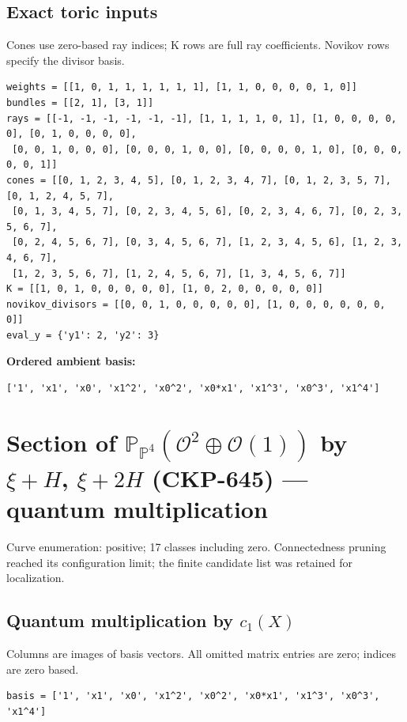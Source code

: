 \documentclass[10pt,a4paper]{article}
\begin{document}
\subsection*{Exact toric inputs}
Cones use zero-based ray indices; K rows are full ray coefficients. Novikov rows specify the divisor basis.

\begin{lstlisting}
weights = [[1, 0, 1, 1, 1, 1, 1, 1], [1, 1, 0, 0, 0, 0, 1, 0]]
bundles = [[2, 1], [3, 1]]
rays = [[-1, -1, -1, -1, -1, -1], [1, 1, 1, 1, 0, 1], [1, 0, 0, 0, 0, 0], [0, 1, 0, 0, 0, 0],
 [0, 0, 1, 0, 0, 0], [0, 0, 0, 1, 0, 0], [0, 0, 0, 0, 1, 0], [0, 0, 0, 0, 0, 1]]
cones = [[0, 1, 2, 3, 4, 5], [0, 1, 2, 3, 4, 7], [0, 1, 2, 3, 5, 7], [0, 1, 2, 4, 5, 7],
 [0, 1, 3, 4, 5, 7], [0, 2, 3, 4, 5, 6], [0, 2, 3, 4, 6, 7], [0, 2, 3, 5, 6, 7],
 [0, 2, 4, 5, 6, 7], [0, 3, 4, 5, 6, 7], [1, 2, 3, 4, 5, 6], [1, 2, 3, 4, 6, 7],
 [1, 2, 3, 5, 6, 7], [1, 2, 4, 5, 6, 7], [1, 3, 4, 5, 6, 7]]
K = [[1, 0, 1, 0, 0, 0, 0, 0], [1, 0, 2, 0, 0, 0, 0, 0]]
novikov_divisors = [[0, 0, 1, 0, 0, 0, 0, 0], [1, 0, 0, 0, 0, 0, 0, 0]]
eval_y = {'y1': 2, 'y2': 3}
\end{lstlisting}

\textbf{Ordered ambient basis:}
\begin{lstlisting}
['1', 'x1', 'x0', 'x1^2', 'x0^2', 'x0*x1', 'x1^3', 'x0^3', 'x1^4']
\end{lstlisting}

\clearpage\section*{Section of $\mathbb P_{\mathbb P^{4}}(\mathcal O^{2}\oplus \mathcal O(1))$ by $\xi +H$, $\xi +2H$ (CKP-645) --- quantum multiplication}

Curve enumeration: positive; 17 classes including zero.
Connectedness pruning reached its configuration limit; the finite candidate list was retained for localization.
\subsection*{Quantum multiplication by $c_1(X)$}
Columns are images of basis vectors. All omitted matrix entries are zero; indices are zero based.

\begin{lstlisting}
basis = ['1', 'x1', 'x0', 'x1^2', 'x0^2', 'x0*x1', 'x1^3', 'x0^3', 'x1^4']
\end{lstlisting}
\end{document}
